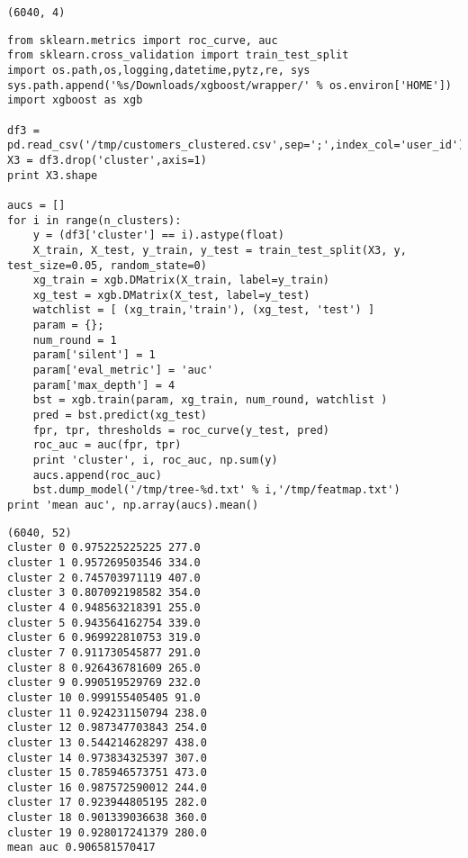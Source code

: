 \documentclass[12pt,fleqn]{article}\usepackage{../common}
\begin{document}
\begin{verbatim}
(6040, 4)
\end{verbatim}

\begin{verbatim}
from sklearn.metrics import roc_curve, auc
from sklearn.cross_validation import train_test_split
import os.path,os,logging,datetime,pytz,re, sys
sys.path.append('%s/Downloads/xgboost/wrapper/' % os.environ['HOME'])
import xgboost as xgb

df3 = pd.read_csv('/tmp/customers_clustered.csv',sep=';',index_col='user_id')
X3 = df3.drop('cluster',axis=1)
print X3.shape

aucs = []
for i in range(n_clusters):
    y = (df3['cluster'] == i).astype(float)
    X_train, X_test, y_train, y_test = train_test_split(X3, y, test_size=0.05, random_state=0)
    xg_train = xgb.DMatrix(X_train, label=y_train)
    xg_test = xgb.DMatrix(X_test, label=y_test)    
    watchlist = [ (xg_train,'train'), (xg_test, 'test') ]    
    param = {}; 
    num_round = 1
    param['silent'] = 1
    param['eval_metric'] = 'auc'
    param['max_depth'] = 4
    bst = xgb.train(param, xg_train, num_round, watchlist )
    pred = bst.predict(xg_test)
    fpr, tpr, thresholds = roc_curve(y_test, pred)
    roc_auc = auc(fpr, tpr)
    print 'cluster', i, roc_auc, np.sum(y)
    aucs.append(roc_auc)
    bst.dump_model('/tmp/tree-%d.txt' % i,'/tmp/featmap.txt')
print 'mean auc', np.array(aucs).mean()
\end{verbatim}

\begin{verbatim}
(6040, 52)
cluster 0 0.975225225225 277.0
cluster 1 0.957269503546 334.0
cluster 2 0.745703971119 407.0
cluster 3 0.807092198582 354.0
cluster 4 0.948563218391 255.0
cluster 5 0.943564162754 339.0
cluster 6 0.969922810753 319.0
cluster 7 0.911730545877 291.0
cluster 8 0.926436781609 265.0
cluster 9 0.990519529769 232.0
cluster 10 0.999155405405 91.0
cluster 11 0.924231150794 238.0
cluster 12 0.987347703843 254.0
cluster 13 0.544214628297 438.0
cluster 14 0.973834325397 307.0
cluster 15 0.785946573751 473.0
cluster 16 0.987572590012 244.0
cluster 17 0.923944805195 282.0
cluster 18 0.901339036638 360.0
cluster 19 0.928017241379 280.0
mean auc 0.906581570417
\end{verbatim}
\end{document}
